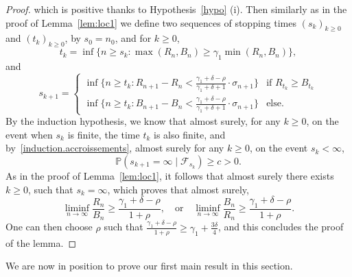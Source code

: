 \documentclass[10pt,a4paper]{amsart}
\newcommand{\1}{{\text{\Large $\mathfrak 1$}}}
\begin{document}
\begin{proof}
which is positive thanks to Hypothesis~\ref{hypo} (i). Then similarly as in the proof of Lemma~\ref{lem:loc1} we define two sequences of stopping times 
$(s_k)_{k\ge 0}$ and $(t_k)_{k\ge 0}$, by 
$s_0 = n_0$, and for $k\ge 0$, 
$$
t_k = \inf\{n\ge s_k : \max(R_n,B_n) \ge \gamma_1 \min(R_n,B_n)\}, 
$$ 
and 
\begin{equation*}
s_{k+1} = \left\{ 
\begin{array}{ll}
\inf\{n \ge t_k : R_{n+1} - R_n < \frac{\gamma_1 + \delta-\rho}{\gamma_1 + \delta+1} \cdot \sigma_{n+1}\} & \text{if }R_{t_k}\ge B_{t_k} \\
 \inf\{n \ge t_k : B_{n+1} - B_n < \frac{\gamma_1 + \delta-\rho}{\gamma_1 + \delta+1} \cdot \sigma_{n+1}\} & \text{else.} 
\end{array}
\right. 
\end{equation*}
By the induction hypothesis, we know that almost surely, for any $k\ge 0$, on the event when $s_k$ is finite, the time $t_k$ is also finite, and by~\eqref{induction.accroissements}, almost surely for any $k\ge 0$, on the event $s_k<\infty$, 
$$\mathbb P(s_{k+1} = \infty \mid \mathcal F_{s_k}) \ge c>0. $$  
As in the proof of Lemma~\ref{lem:loc1}, it follows that almost surely there exists $k\ge 0$, such that $s_k = \infty$, which proves that almost surely, 
$$\liminf_{n\to \infty} \frac{R_n}{B_n}\ge \frac{\gamma_1 + \delta - \rho}{1+ \rho}, \quad \text{or}\quad \liminf_{n\to \infty} \frac{B_n}{R_n}\ge \frac{\gamma_1 + \delta - \rho}{1+ \rho}. $$
One can then choose $\rho$ such that $\frac{\gamma_1 + \delta - \rho}{1+ \rho}\ge \gamma_1 + \frac{3\delta}{4}$, and this concludes the proof of the lemma.  
\end{proof}

We are now in position to prove our first main result in this section. 
\end{document}
